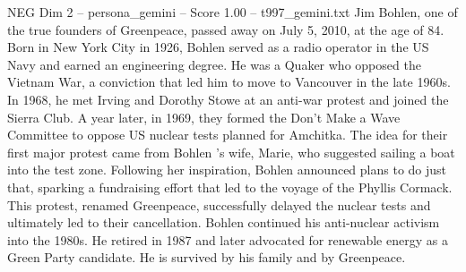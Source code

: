 \begin{textsample}{NEG Dim 2 – persona\_gemini – Score 1.00 – t997\_gemini.txt}  \label{ex:f2_neg_019}
Jim Bohlen, one of the true founders of Greenpeace, passed away on July 5, 2010, at the age of 84.
Born in New York City in 1926, Bohlen served as a radio operator in the US Navy and earned an engineering degree.
He was a Quaker who opposed the Vietnam War, a conviction that led him to move to Vancouver in the late 1960s.
In 1968, he met Irving and Dorothy Stowe at an anti-war protest and joined the Sierra Club.
A year later, in 1969, they formed the Don't Make a Wave Committee to oppose US nuclear tests planned for Amchitka.
The idea for their first major protest came from Bohlen 's wife, Marie, who suggested sailing a boat into the test zone.
Following her inspiration, Bohlen announced plans to do just that, sparking a fundraising effort that led to the voyage of the Phyllis Cormack.
This protest, renamed Greenpeace, successfully delayed the nuclear tests and ultimately led to their cancellation.
Bohlen continued his anti-nuclear activism into the 1980s.
He retired in 1987 and later advocated for renewable energy as a Green Party candidate.
He is survived by his family and by Greenpeace.

\end{textsample}
